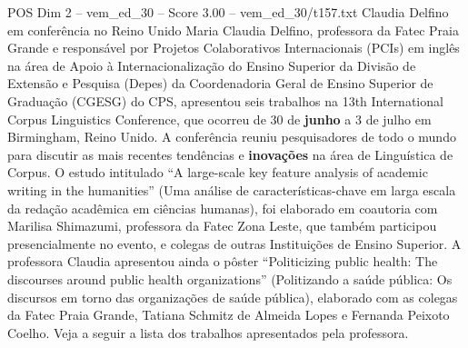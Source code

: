 \begin{textsample}{POS Dim 2 – vem\_ed\_30 – Score 3.00 – vem\_ed\_30/t157.txt}  \label{ex:f2_pos_150}
Claudia Delfino em conferência no Reino Unido Maria Claudia Delfino, professora da Fatec Praia Grande e responsável por Projetos Colaborativos Internacionais (PCIs) em inglês na área de Apoio à Internacionalização do Ensino Superior da Divisão de Extensão e Pesquisa (Depes) da Coordenadoria Geral de Ensino Superior de Graduação (CGESG) do CPS, apresentou seis trabalhos na 13th International Corpus Linguistics Conference, que ocorreu de 30 de \textbf{junho} a 3 de julho em Birmingham, Reino Unido.
A conferência reuniu pesquisadores de todo o mundo para discutir as mais recentes tendências e \textbf{inovações} na área de Linguística de Corpus.
O estudo intitulado “A large-scale key feature analysis of academic writing in the humanities” (Uma análise de características-chave em larga escala da redação acadêmica em ciências humanas), foi elaborado em coautoria com Marilisa Shimazumi, professora da Fatec Zona Leste, que também participou presencialmente no evento, e colegas de outras Instituições de Ensino Superior.
A professora Claudia apresentou ainda o pôster “Politicizing public health: The discourses around public health organizations” (Politizando a saúde pública: Os discursos em torno das organizações de saúde pública), elaborado com as colegas da Fatec Praia Grande, Tatiana Schmitz de Almeida Lopes e Fernanda Peixoto Coelho.
Veja a seguir a lista dos trabalhos apresentados pela professora.

\end{textsample}
